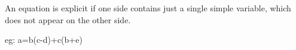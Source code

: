An equation is explicit if one side contains just a single
simple variable, which does not appear on the other side.
\par
eg:
a=b(c-d)+c(b+e)